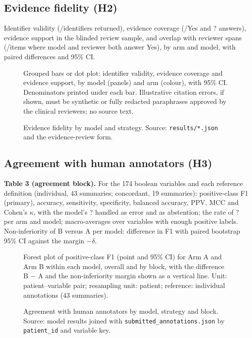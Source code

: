 \subsection{Evidence fidelity (H2)}

\begin{resultspending}
Identifier validity (/identifiers returned), evidence coverage (/Yes and ? answers), evidence support in the
blinded review sample, and overlap with reviewer spans (/items where model and reviewer both answer Yes), by arm
and model, with paired differences and 95\% CI.
\end{resultspending}

\begin{figure}[tbp]
\begin{resultspending}[title={Figure 5 --- Evidence fidelity (RESULTS\_PENDING)}]
Grouped bars or dot plot: identifier validity, evidence coverage and evidence support, by model (panels) and arm
(colour), with 95\% CI. Denominators printed under each bar. Illustrative citation errors, if shown, must be
synthetic or fully redacted paraphrases approved by the clinical reviewers; no source text.
\end{resultspending}
\caption{Evidence fidelity by model and strategy. Source: \texttt{results/*.json} and the evidence-review form.}
\label{fig:evidence}
\end{figure}

\subsection{Agreement with human annotators (H3)}

\begin{resultspending}
\textbf{Table 3 (agreement block).} For the 174 boolean variables and each reference definition (individual,
43 summaries; concordant, 19 summaries): positive-class F1 (primary), accuracy, sensitivity, specificity,
balanced accuracy, PPV, MCC and Cohen's $\kappa$, with the model's ? handled as error and as abstention; the rate of
? per arm and model; macro-averages over variables with enough positive labels. Non-inferiority of B versus A per
model: difference in F1 with paired bootstrap 95\% CI against the margin $-\delta$.
\end{resultspending}

\begin{figure}[tbp]
\begin{resultspending}[title={Figure 4 --- Agreement by model and strategy (RESULTS\_PENDING)}]
Forest plot of positive-class F1 (point and 95\% CI) for Arm A and Arm B within each model, overall and by block,
with the difference B $-$ A and the non-inferiority margin shown as a vertical line. Unit: patient--variable pair;
resampling unit: patient; reference: individual annotations (43 summaries).
\end{resultspending}
\caption{Agreement with human annotators by model, strategy and block. Source: model results joined with
\texttt{submitted\_annotations.json} by \texttt{patient\_id} and variable key.}
\label{fig:agreement}
\end{figure}

